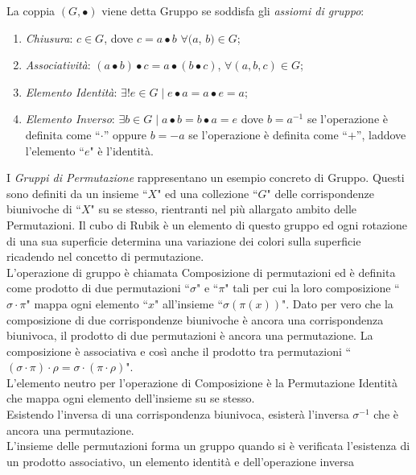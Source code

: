 \documentclass[a4paper,12pt]{tesiinfo}
\begin{document}
La coppia $ (G, \bullet)$ viene detta Gruppo se soddisfa gli \textit{assiomi di gruppo}:
\begin{enumerate}
    \item \textit{Chiusura}: $ c \in G$, dove $c = a\bullet b$ $ \forall (a$, $b) \in G$;
    \item \textit{Associativit\`a}: $\left ( a\bullet b \right ) \bullet c = a \bullet \left ( b \bullet c \right ) $, $ \forall (a, b, c) \in G$;
    \item \textit{Elemento Identit\`a}: $ \exists ! e \in G \mid e \bullet a = a \bullet e = a$;
    \item \textit{Elemento Inverso}: $\exists b \in G \mid a \bullet b = b \bullet a = e$ dove $b = a^{-1} $ se l'operazione \`e definita come ``$\cdot$'' oppure $b = -a $ se l'operazione \`e definita come ``$+$'', laddove l'elemento ``$e$" \`e l'identit\`a.
\end{enumerate} 
I \textit{Gruppi di Permutazione} rappresentano un esempio concreto di Gruppo. Questi sono definiti da un insieme ``$X$" ed una collezione ``$G$" delle corrispondenze biunivoche di ``$X$" su se stesso, rientranti nel pi\`u allargato ambito delle Permutazioni. Il cubo di Rubik \`e un elemento di questo gruppo ed ogni rotazione di una sua superficie determina una variazione dei colori sulla superficie  ricadendo nel concetto di permutazione.
\\
L'operazione di gruppo \`e chiamata Composizione di permutazioni ed \`e definita come prodotto di due permutazioni ``$\sigma$" e ``$\pi$" tali per cui la loro composizione ``$\sigma \cdot \pi$" mappa ogni elemento ``$x$" all'insieme ``$\sigma ( \pi ( x ) )$". Dato per vero che la composizione di due corrispondenze biunivoche \`e ancora una corrispondenza biunivoca, il prodotto di due permutazioni \`e ancora una permutazione. La composizione \`e associativa e cos\`i anche il prodotto tra permutazioni ``$ (\sigma \cdot \pi) \cdot \rho = \sigma \cdot ( \pi \cdot \rho )$".
\\
L'elemento neutro per l'operazione di Composizione \`e la Permutazione Identit\`a che mappa ogni elemento dell'insieme su se stesso. 
\\
Esistendo l'inversa di una corrispondenza biunivoca, esister\`a l'inversa $ \sigma ^ {-1} $ che \`e ancora una permutazione.
\\
L'insieme delle permutazioni forma un gruppo quando si \`e verificata l'esistenza di un prodotto associativo, un elemento identit\`a e dell'operazione inversa
\end{document}

